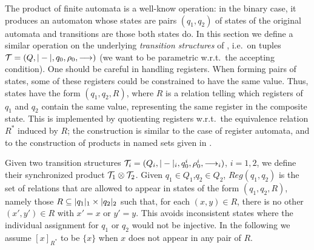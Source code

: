 \newcommand{\eq}[1]{#1}
\newcommand{\syncQ}{Q_{\syncp}}
\newcommand{\syncW}[1]{\weight{#1}_{\syncp}}
\newcommand{\syncAss}{\rho_0^{\syncp}}
\newcommand{\syncInit}{q_0^{\syncp}}
\newcommand{\syncTr}[1]{\xymatrix@C-=4ex{\ar[r]^{#1}&\!_{\syncp}}}
\newcommand{\syncHtr}[2]{\xymatrix@C-=4ex{\ar[r]^{#1}_{#2}&\!_{\syncp}}}
\newcommand{\regrule}{\textsc{(Reg)}}
\newcommand{\allrule}{\textsc{(Alloc)}}
\newcommand{\cproj}{\pi}

The product of finite automata is a well-know operation: in the binary case, it produces an automaton whose states are pairs $(q_1,q_2)$ of states of the original automata and transitions are those both states do. In this section we define a similar operation on the underlying \emph{transition structures} of \hdmas{}, i.e.\ on tuples $\mathcal{T} = (Q,|-|,q_0,\rho_0,\longrightarrow)$ (we want to be parametric w.r.t.\ the accepting condition). One should  be careful in handling registers. When forming pairs of states, some of these registers could be constrained to have the same value.
Thus, states have the form $(q_1,q_2,R)$, where $R$ is a relation telling which registers of $q_1$ and $q_2$ contain the same value, representing the same register in the composite state. This is implemented by quotienting registers w.r.t.\ the equivalence relation $R^*$ induced by $R$; the construction is similar to the case of register automata, and to the construction of products in named sets given in \cite{CianciaM10}.

Given two transition structures $\mathcal{T}_i = (Q_i,|-|_i,q_0^i,\rho_0^i,\longrightarrow_i)$, $i=1,2$, we define their synchronized product $\mathcal{T}_1 \otimes \mathcal{T}_2$. Given $q_1 \in Q_1$,$q_2 \in Q_2$, $Reg(q_1,q_2)$ is the set of relations that are allowed to appear in states of the form $(q_1,q_2,R)$, namely those $R \subseteq |q_1|_1 \times |q_2|_2$ such that, for each $(x,y) \in R$, there is no other $(x',y') \in R$ with $x'=x$ or $y'=y$. This avoids inconsistent states where the individual assignment for $q_1$ or $q_2$ would not be injective. In the following we assume $[x]_{R^*}$ to be $\{x\}$ when $x$ does not appear in any pair of $R$.



